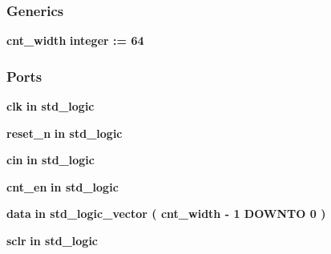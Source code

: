 \subsubsection*{Generics}
 \begin{DoxyCompactItemize}
\item 
{\bf cnt\+\_\+width} {\bfseries {\bfseries \textcolor{comment}{integer}\textcolor{vhdlchar}{ }\textcolor{vhdlchar}{ }\textcolor{vhdlchar}{\+:}\textcolor{vhdlchar}{=}\textcolor{vhdlchar}{ }\textcolor{vhdlchar}{ } \textcolor{vhdldigit}{64} \textcolor{vhdlchar}{ }}}
\end{DoxyCompactItemize}
\subsubsection*{Ports}
 \begin{DoxyCompactItemize}
\item 
{\bf clk}  {\bfseries {\bfseries \textcolor{keywordflow}{in}\textcolor{vhdlchar}{ }}} {\bfseries \textcolor{comment}{std\+\_\+logic}\textcolor{vhdlchar}{ }} 
\item 
{\bf reset\+\_\+n}  {\bfseries {\bfseries \textcolor{keywordflow}{in}\textcolor{vhdlchar}{ }}} {\bfseries \textcolor{comment}{std\+\_\+logic}\textcolor{vhdlchar}{ }} 
\item 
{\bf cin}  {\bfseries {\bfseries \textcolor{keywordflow}{in}\textcolor{vhdlchar}{ }}} {\bfseries \textcolor{comment}{std\+\_\+logic}\textcolor{vhdlchar}{ }} 
\item 
{\bf cnt\+\_\+en}  {\bfseries {\bfseries \textcolor{keywordflow}{in}\textcolor{vhdlchar}{ }}} {\bfseries \textcolor{comment}{std\+\_\+logic}\textcolor{vhdlchar}{ }} 
\item 
{\bf data}  {\bfseries {\bfseries \textcolor{keywordflow}{in}\textcolor{vhdlchar}{ }}} {\bfseries \textcolor{comment}{std\+\_\+logic\+\_\+vector}\textcolor{vhdlchar}{ }\textcolor{vhdlchar}{(}\textcolor{vhdlchar}{ }\textcolor{vhdlchar}{ }\textcolor{vhdlchar}{ }\textcolor{vhdlchar}{ }{\bfseries {\bf cnt\+\_\+width}} \textcolor{vhdlchar}{-\/}\textcolor{vhdlchar}{ } \textcolor{vhdldigit}{1} \textcolor{vhdlchar}{ }\textcolor{keywordflow}{D\+O\+W\+N\+TO}\textcolor{vhdlchar}{ }\textcolor{vhdlchar}{ } \textcolor{vhdldigit}{0} \textcolor{vhdlchar}{ }\textcolor{vhdlchar}{)}\textcolor{vhdlchar}{ }} 
\item 
{\bf sclr}  {\bfseries {\bfseries \textcolor{keywordflow}{in}\textcolor{vhdlchar}{ }}} {\bfseries \textcolor{comment}{std\+\_\+logic}\textcolor{vhdlchar}{ }} 
\item 

\end{DoxyCompactItemize}
